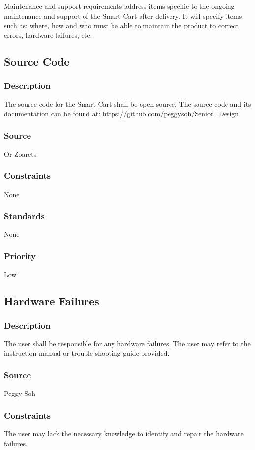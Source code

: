 Maintenance and support requirements address items specific to the ongoing maintenance and support of the Smart Cart after delivery. It will specify items such as: where, how and who must be able to maintain the product to correct errors, hardware failures, etc.

\subsection{Source Code}
\subsubsection{Description}
The source code for the Smart Cart shall be open-source. The source code and its documentation can be found at: https://github.com/peggysoh/Senior_Design
\subsubsection{Source}
Or Zoarets
\subsubsection{Constraints}
None
\subsubsection{Standards}
None
\subsubsection{Priority}
Low

\subsection{Hardware Failures}
\subsubsection{Description}
The user shall be responsible for any hardware failures. The user may refer to the instruction manual or trouble shooting guide provided.
\subsubsection{Source}
Peggy Soh
\subsubsection{Constraints}
The user may lack the necessary knowledge to identify and repair the hardware failures.
